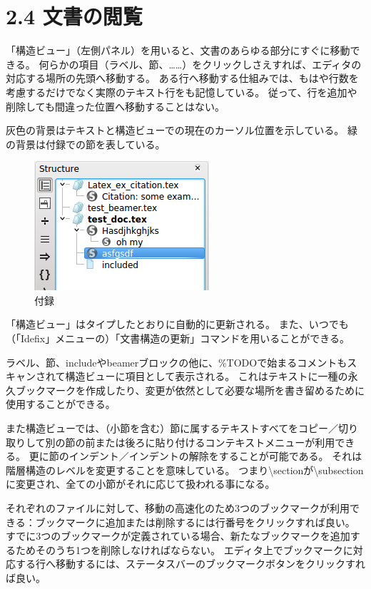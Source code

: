 \documentclass[]{book}
\makeatletter
\def\maxwidth{\ifdim\Gin@nat@width>\linewidth\linewidth
\else\Gin@nat@width\fi}
\let\Oldincludegraphics\includegraphics
\renewcommand{\includegraphics}[1]{\Oldincludegraphics[width=\maxwidth]{#1}}
\makeatother
\begin{document}
\section{2.4 文書の閲覧}

「構造ビュー」（左側パネル）を用いると、文書のあらゆる部分にすぐに移動できる。
何らかの項目（ラベル、節、\ldots{}\ldots{}）をクリックしさえすれば、エディタの対応する場所の先頭へ移動する。
ある行へ移動する仕組みでは、もはや行数を考慮するだけでなく実際のテキスト行をも記憶している。
従って、行を追加や削除しても間違った位置へ移動することはない。

灰色の背景はテキストと構造ビューでの現在のカーソル位置を示している。
緑の背景は付録での節を表している。

\begin{figure}[htbp]
\centering
\includegraphics{doc5.png}
\caption{付録}
\end{figure}

「構造ビュー」はタイプしたとおりに自動的に更新される。
また、いつでも（「Idefix」メニューの）「文書構造の更新」コマンドを用いることができる。

ラベル、節、includeやbeamerブロックの他に、\%TODOで始まるコメントもスキャンされて構造ビューに項目として表示される。
これはテキストに一種の永久ブックマークを作成したり、変更が依然として必要な場所を書き留めるために使用することができる。

また構造ビューでは、（小節を含む）節に属するテキストすべてをコピー／切り取りして別の節の前または後ろに貼り付けるコンテキストメニューが利用できる。
更に節のインデント／インデントの解除をすることが可能である。
それは階層構造のレベルを変更することを意味している。
つまり\textbackslash{}sectionが\textbackslash{}subsectionに変更され、全ての小節がそれに応じて扱われる事になる。

それぞれのファイルに対して、移動の高速化のため3つのブックマークが利用できる：ブックマークに追加または削除するには行番号をクリックすれば良い。
すでに3つのブックマークが定義されている場合、新たなブックマークを追加するためそのうち1つを削除しなければならない。
エディタ上でブックマークに対応する行へ移動するには、ステータスバーのブックマークボタンをクリックすれば良い。
\end{document}
